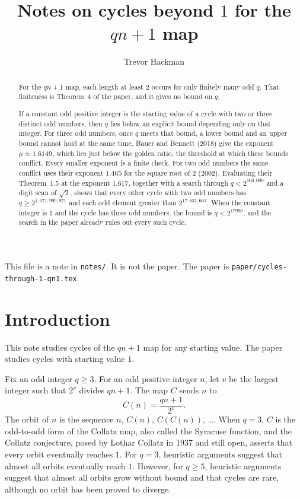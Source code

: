 \documentclass[11pt]{article}
\title{Notes on cycles beyond $1$ for the $qn+1$ map}
\author{Trevor Hackman}
\date{}
\begin{document}
\maketitle

This file is a note in \texttt{notes/}.
It is not the paper.
The paper is \texttt{paper/cycles-through-1-qn1.tex}.

\begin{abstract}
\setlength{\parskip}{\baselineskip}%
\setlength{\parindent}{0pt}%
\noindent
For the $qn+1$ map, each length at least $2$ occurs for only finitely many odd $q$.
That finiteness is Theorem~4 of the paper, and it gives no bound on $q$.

If a constant odd positive integer is the starting value of a cycle with two or three distinct odd numbers, then $q$ lies below an explicit bound depending only on that integer.
For three odd numbers, once $q$ meets that bound, a lower bound and an upper bound cannot hold at the same time.
Bauer and Bennett (2018) give the exponent $\mu \approx 1.6149$, which lies just below the golden ratio, the threshold at which these bounds conflict.
Every smaller exponent is a finite check.
For two odd numbers the same conflict uses their exponent $1.465$ for the square root of $2$ (2002).
Evaluating their Theorem~1.5 at the exponent $1.617$, together with a search through $q < 2^{160{,}000}$ and a digit scan of $\sqrt{2}$, shows that every other cycle with two odd numbers has $q \ge 2^{1{,}071{,}999{,}971}$ and each odd element greater than $2^{17{,}631{,}663}$.
When the constant integer is $1$ and the cycle has three odd numbers, the bound is $q < 2^{17990}$, and the search in the paper already rules out every such cycle.
\end{abstract}

\begingroup
\setlength{\parskip}{0pt}
\small
\tableofcontents
\endgroup

\section{Introduction}
\label{sec:introduction}

This note studies cycles of the $qn+1$ map for any starting value.
The paper~\cite{hackman-i} studies cycles with starting value $1$.

Fix an odd integer $q \ge 3$.
For an odd positive integer $n$, let $v$ be the largest integer such that $2^v$ divides $qn+1$.
The map $C$ sends $n$ to
\[
C(n) = \frac{qn+1}{2^v}.
\]
The orbit of $n$ is the sequence $n$, $C(n)$, $C(C(n))$, \ldots.
When $q = 3$, $C$ is the odd-to-odd form of the Collatz map, also called the Syracuse function, and the Collatz conjecture, posed by Lothar Collatz in 1937 and still open, asserts that every orbit eventually reaches $1$.
For $q = 3$, heuristic arguments suggest that almost all orbits eventually reach $1$.
However, for $q \ge 5$, heuristic arguments suggest that almost all orbits grow without bound and that cycles are rare, although no orbit has been proved to diverge.
\end{document}
